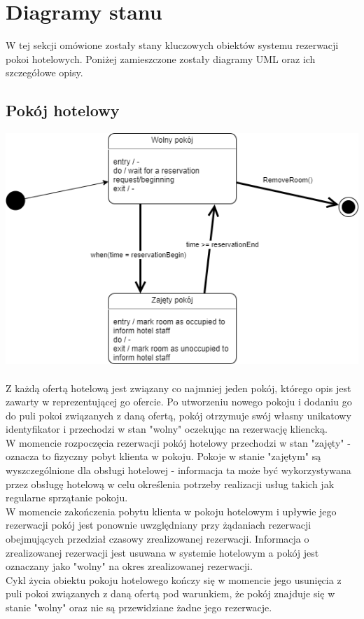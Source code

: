\documentclass{article}
\begin{document}
\section{Diagramy stanu}
\indent \indent W tej sekcji omówione zostały stany kluczowych obiektów systemu rezerwacji pokoi hotelowych. Poniżej zamieszczone zostały diagramy UML oraz ich szczegółowe opisy.
\subsection{Pokój hotelowy}

\includegraphics[width=\linewidth]{checkpoint1/RoomStateDiagram.png}
\\
\\
\indent Z każdą ofertą hotelową jest związany co najmniej jeden pokój, którego opis jest zawarty w reprezentującej go ofercie. Po utworzeniu nowego pokoju i dodaniu go do puli pokoi związanych z daną ofertą, pokój otrzymuje swój własny unikatowy identyfikator i przechodzi w stan "wolny" oczekując na rezerwację kliencką.\\
\indent W momencie rozpoczęcia rezerwacji pokój hotelowy przechodzi w stan "zajęty" - oznacza to fizyczny pobyt klienta w pokoju. Pokoje w stanie "zajętym" są wyszczególnione dla obsługi hotelowej - informacja ta może być wykorzystywana przez obsługę hotelową w celu określenia potrzeby realizacji usług takich jak regularne sprzątanie pokoju.\\
\indent W momencie zakończenia pobytu klienta w pokoju hotelowym i upływie jego rezerwacji pokój jest ponownie uwzględniany przy żądaniach rezerwacji obejmujących przedział czasowy zrealizowanej rezerwacji. Informacja o zrealizowanej rezerwacji jest usuwana w systemie hotelowym a pokój jest oznaczany jako "wolny" na okres zrealizowanej rezerwacji.\\
\indent Cykl życia obiektu pokoju hotelowego kończy się w momencie jego usunięcia z puli pokoi związanych z daną ofertą pod warunkiem, że pokój znajduje się w stanie "wolny" oraz nie są przewidziane żadne jego rezerwacje.
\end{document}
